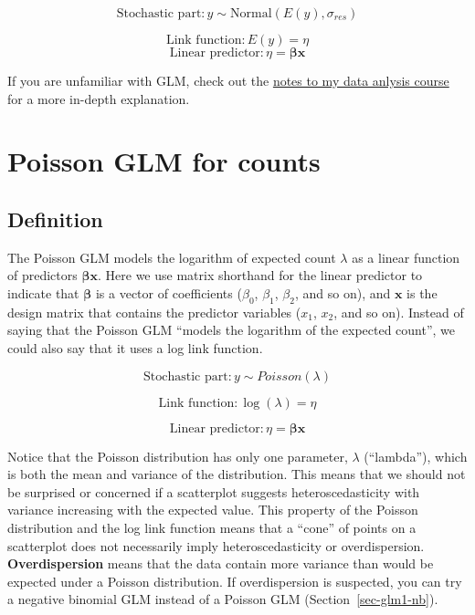 \documentclass[
  13,
  letterpaper,
]{report}
\begin{document}
\[\text{Stochastic part}:y\sim \text{Normal}\left(E\left(y\right),\sigma_{res}\right)\]

\[\text{Link function}:E\left(y\right)=\eta\]
\[\text{Linear predictor}:\eta=\boldsymbol{\beta}\mathbf{x}\]

If you are unfamiliar with GLM, check out the
\href{https://greenquanteco.github.io/appl-biol-data-analysis/chapters/ch18.html}{notes
to my data anlysis course} for a more in-depth explanation.

\section{Poisson GLM for counts}\label{sec-glm1-pois}

\subsection{Definition}\label{sec-glm1-pois-def}

The Poisson GLM models the logarithm of expected count \(\lambda\) as a
linear function of predictors \(\boldsymbol{\beta}\mathbf{x}\). Here we
use matrix shorthand for the linear predictor to indicate that
\(\boldsymbol{\beta}\) is a vector of coefficients (\(\beta_0\),
\(\beta_1\), \(\beta_2\), and so on), and \(\mathbf{x}\) is the design
matrix that contains the predictor variables (\(x_1\), \(x_2\), and so
on). Instead of saying that the Poisson GLM ``models the logarithm of
the expected count'', we could also say that it uses a log link
function.

\[\text{Stochastic part}:y\sim Poisson\left(\lambda\right)\]

\[\text{Link function}:\log\left(\lambda\right)=\eta\]

\[\text{Linear predictor}:\eta=\boldsymbol{\beta}\mathbf{x}\]

Notice that the Poisson distribution has only one parameter, \(\lambda\)
(``lambda''), which is both the mean and variance of the distribution.
This means that we should not be surprised or concerned if a scatterplot
suggests heteroscedasticity with variance increasing with the expected
value. This property of the Poisson distribution and the log link
function means that a ``cone'' of points on a scatterplot does not
necessarily imply heteroscedasticity or overdispersion.
\textbf{Overdispersion} means that the data contain more variance than
would be expected under a Poisson distribution. If overdispersion is
suspected, you can try a negative binomial GLM instead of a Poisson GLM
(Section~\ref{sec-glm1-nb}).
\end{document}
